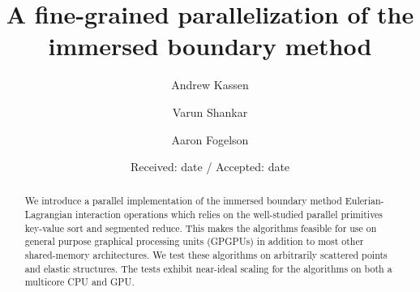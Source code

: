 \newcommand{\thrust}{\texttt{thrust}}
\newcommand{\term}[1]{\textit{#1}}

%


\title{%
    A fine-grained parallelization of the immersed boundary method
}


\author{Andrew Kassen \and Varun Shankar \and Aaron Fogelson}

\authorrunning{}


\date{Received: date / Accepted: date}


\maketitle

\begin{abstract}
We introduce a parallel implementation of the immersed boundary method
Euler\-ian-Lagrangian interaction operations which relies on the well-studied parallel
primitives key-value sort and segmented reduce. This makes the algorithms feasible for
use on general purpose graphical processing units (GPGPUs) in addition to most other
shared-memory architectures. We test these algorithms on arbitrarily scattered points and
elastic structures. The tests exhibit near-ideal scaling for the algorithms on both a
multicore CPU and GPU\@.

\end{abstract}







